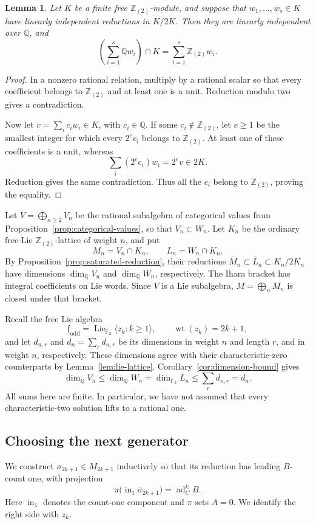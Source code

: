 \documentclass[11pt]{article}
\newcommand{\Q}{\mathbb Q}
\newcommand{\Z}{\mathbb Z}
\newcommand{\F}{{\mathbb F_2}}
\newcommand{\Lie}{\operatorname{Lie}}
\DeclareMathOperator{\ad}{ad}
\DeclareMathOperator{\wt}{wt}
\newtheorem{lemma}[theorem]{Lemma}
\theoremstyle{definition}
\theoremstyle{remark}
\numberwithin{equation}{section}
\begin{document}
\begin{lemma}\label{lem:hall-saturation}
Let \(K\) be a finite free \(\Z_{(2)}\)-module, and suppose that
\(w_1,\ldots,w_s\in K\) have linearly independent reductions in
\(K/2K\).  Then they are linearly independent over \(\Q\), and
\[
 \left(\sum_{i=1}^s\Q w_i\right)\cap K
   =\sum_{i=1}^s\Z_{(2)}w_i.
\]
\end{lemma}
\begin{proof}
In a nonzero rational relation, multiply by a rational scalar so
that every coefficient belongs to \(\Z_{(2)}\) and at least one is
a unit.  Reduction modulo two gives a contradiction.

Now let \(v=\sum_i c_iw_i\in K\), with \(c_i\in\Q\).
If some \(c_i\notin\Z_{(2)}\), let \(e\ge1\) be the smallest integer
for which every \(2^ec_i\) belongs to \(\Z_{(2)}\).
At least one of these coefficients is a unit, whereas
\[
 \sum_i(2^ec_i)w_i=2^ev\in2K.
\]
Reduction gives the same contradiction.  Thus all the \(c_i\)
belong to \(\Z_{(2)}\), proving the equality.
\end{proof}

Let \(V=\bigoplus_{n\ge2}V_n\) be the rational subalgebra of
categorical values from Proposition~\ref{prop:categorical-values},
so that \(V_n\subset W_n\).
Let \(K_n\) be the ordinary free-Lie \(\Z_{(2)}\)-lattice of
weight \(n\), and put
\[
 M_n=V_n\cap K_n,\qquad L_n=W_n\cap K_n.
\]
By Proposition~\ref{prop:saturated-reduction}, their reductions
\(\overline M_n\subset\overline L_n\subset K_n/2K_n\) have
dimensions \(\dim_\Q V_n\) and \(\dim_\Q W_n\), respectively.
The Ihara bracket has integral coefficients on Lie words.
Since \(V\) is a Lie subalgebra, \(M=\bigoplus_n M_n\) is closed
under that bracket.

Recall the free Lie algebra
\[
 \mathfrak f_{\mathrm{odd}}
   =\Lie_{\F}\langle z_k:k\ge1\rangle,\qquad
 \wt(z_k)=2k+1,
\]
and let \(d_{n,r}\) and \(d_n=\sum_r d_{n,r}\) be its dimensions
in weight \(n\) and length \(r\), and in weight \(n\), respectively.
These dimensions agree with their characteristic-zero counterparts
by Lemma~\ref{lem:lie-lattice}.
Corollary~\ref{cor:dimension-bound} gives
\begin{equation}\label{eq:dimension-squeeze}
 \dim_\Q V_n
 \le \dim_\Q W_n
 =\dim_\F\overline L_n
 \le\sum_r d_{n,r}=d_n.
\end{equation}
All sums here are finite.  In particular, we have not assumed
that every characteristic-two solution lifts to a rational one.

\subsection{Choosing the next generator}
We construct \(\sigma_{2k+1}\in M_{2k+1}\) inductively so that
its reduction has leading \(B\)-count one, with projection
\begin{equation}\label{eq:generator-leading-term}
 \pi\bigl(\operatorname{in}_1\overline\sigma_{2k+1}\bigr)
       =\ad_C^kB.
\end{equation}
Here \(\operatorname{in}_1\) denotes the count-one component and
\(\pi\) sets \(A=0\).  We identify the right side with \(z_k\).
\end{document}
